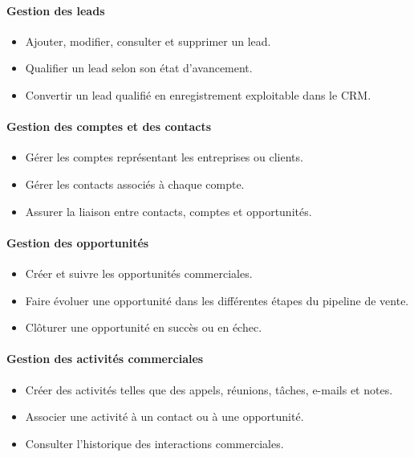 \documentclass[12pt,a4paper,twoside,openany]{book}
\begin{document}
\paragraph{Gestion des leads}
\begin{itemize}
    \item Ajouter, modifier, consulter et supprimer un lead.
    \item Qualifier un lead selon son état d’avancement.
    \item Convertir un lead qualifié en enregistrement exploitable dans le CRM.
\end{itemize}

\paragraph{Gestion des comptes et des contacts}
\begin{itemize}
    \item Gérer les comptes représentant les entreprises ou clients.
    \item Gérer les contacts associés à chaque compte.
    \item Assurer la liaison entre contacts, comptes et opportunités.
\end{itemize}

\paragraph{Gestion des opportunités}
\begin{itemize}
    \item Créer et suivre les opportunités commerciales.
    \item Faire évoluer une opportunité dans les différentes étapes du pipeline de vente.
    \item Clôturer une opportunité en succès ou en échec.
\end{itemize}

\paragraph{Gestion des activités commerciales}
\begin{itemize}
    \item Créer des activités telles que des appels, réunions, tâches, e-mails et notes.
    \item Associer une activité à un contact ou à une opportunité.
    \item Consulter l’historique des interactions commerciales.
\end{itemize}
\end{document}
